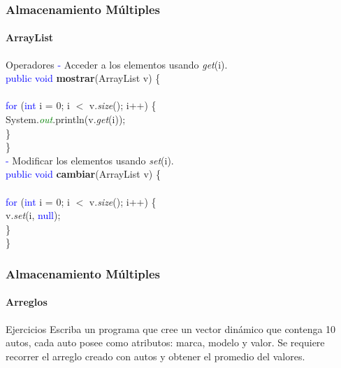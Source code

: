 \documentclass{beamer}
\begin{document}
        \begin{frame}
			\frametitle{Almacenamiento M\'ultiples}
			\framesubtitle{ArrayList}

			\begin{block}{Operadores}
			    {\scriptsize
			        \textcolor{blue}{-} Acceder a los elementos usando \emph{get}(i). \\ \vspace{0.25cm}
                    \hspace{1cm} \textcolor{blue}{public void} \textbf{mostrar}(ArrayList v) \{ \\
                    \hspace{1cm} \\
                    \hspace{2cm} \textcolor{blue}{for} (\textcolor{blue}{int} i = 0; i $<$ v.\emph{size}(); i++) \{ \\
                    \hspace{3cm} System.\emph{\textcolor{green}{out}}.println(v.\emph{get}(i));\\ 
                    \hspace{2cm} \} \\
                    \hspace{1cm} \} \\ \vspace{0.25cm}
			        \textcolor{blue}{-} Modificar los elementos usando \emph{set}(i).\\ \vspace{0.25cm}
                    \hspace{1cm} \textcolor{blue}{public void} \textbf{cambiar}(ArrayList v) \{ \\
                    \hspace{1cm} \\
                    \hspace{2cm} \textcolor{blue}{for} (\textcolor{blue}{int} i = 0; i $<$ v.\emph{size}(); i++) \{ \\
                    \hspace{3cm} v.\emph{set}(i, \textcolor{blue}{null});\\ 
                    \hspace{2cm} \} \\
                    \hspace{1cm} \} 
			    }
			\end{block}
		\end{frame}

\begin{frame}
			\frametitle{Almacenamiento M\'ultiples}
			\framesubtitle{Arreglos}
\begin{exampleblock}{Ejercicios}
			    {\scriptsize
				    Escriba un programa que cree un vector din\'amico que contenga  10  autos, cada auto posee como atributos: marca, modelo y valor. Se requiere recorrer el arreglo creado con autos y obtener el  promedio del valores.
			    }
			\end{exampleblock}
		\end{frame}
\end{document}
